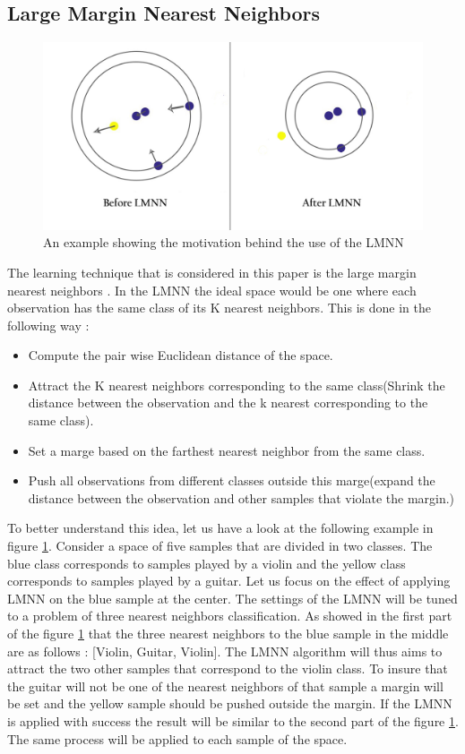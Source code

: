\documentclass[hidelinks,12pt]{report}
\begin{document}
\subsection{Large Margin Nearest Neighbors}
\begin{figure}[t!]
  
  \centering
	    \includegraphics[width=1\textwidth]{lmnn}
    \caption{An example showing the motivation behind the use of the LMNN}
    \label{LMNN}
\end{figure}
The learning technique that is considered in this paper is the large margin nearest neighbors \cite{W09}. In the LMNN the ideal space would be one where each observation has the same class of its K nearest neighbors. This is done in the following way :
\begin{itemize}
\item Compute the pair wise Euclidean distance of the space.
\item Attract the K nearest neighbors corresponding to the same class(Shrink the distance between the observation and the k nearest corresponding to the same class).
\item Set a marge based on the farthest nearest neighbor from the same class.
\item Push all observations from different classes outside this marge(expand the distance between the observation and other samples that violate the margin.)
\end{itemize}
To better understand this idea, let us have a look at the following example in figure \ref{LMNN}. Consider a space of five samples that are divided in two classes. The blue class corresponds to samples played by a violin and the yellow class corresponds to samples played by a guitar. Let us focus on the effect of applying LMNN on the blue sample at the center. The settings of the LMNN will be tuned to a problem of three nearest neighbors classification. As showed in the first part of the figure \ref{LMNN}  that the three nearest neighbors to the blue sample in the middle are as follows : [Violin, Guitar, Violin]. The LMNN algorithm will thus aims to attract the two other samples that correspond to the violin class. To insure that the guitar will not be one of the nearest neighbors of that sample a margin will be set and the yellow sample should be pushed outside the margin. If the LMNN is applied with success the result will be similar to the second part of the figure \ref{LMNN}. The same process will be applied to each sample of the space.
\end{document}
